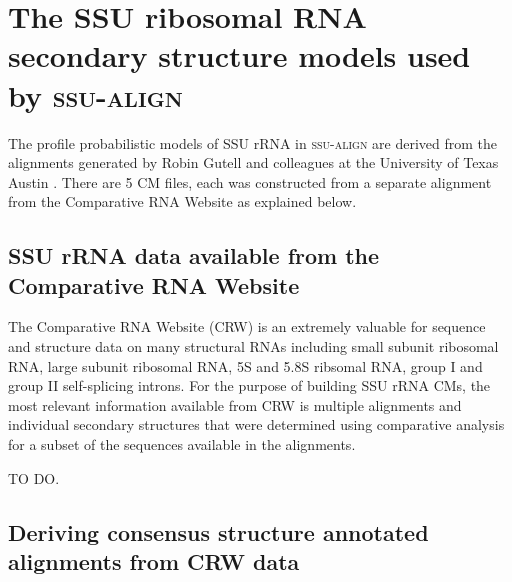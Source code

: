 \section{The SSU ribosomal RNA secondary structure models used by \textsc{ssu-align}}

The profile probabilistic models of SSU rRNA in \textsc{ssu-align} are
derived from the alignments generated by Robin Gutell and colleagues
at the University of Texas Austin \cite{Cannone02}. There are 5 CM
files, each was constructed from a separate alignment from the
Comparative RNA Website as explained below.

\subsection{SSU rRNA data available from the Comparative RNA Website}

The Comparative RNA Website (CRW) is an extremely valuable for
sequence and structure data on many structural RNAs including small
subunit ribosomal RNA, large subunit ribosomal RNA, 5S and 5.8S
ribsomal RNA, group I and group II self-splicing introns. For the
purpose of building SSU rRNA CMs, the most relevant information
available from CRW is multiple alignments and individual secondary
structures that were determined using comparative analysis for a
subset of the sequences available in the alignments. 

TO DO.

\subsection{Deriving consensus structure annotated alignments from CRW data}

